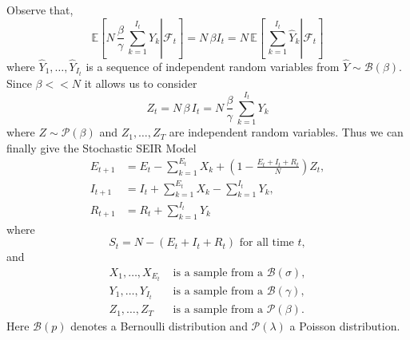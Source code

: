 \documentclass[12pt]{article}\usepackage[]{graphicx}\usepackage[]{color}
\begin{document}
Observe that,
$$
\mathbb{E}\left[\left.N \, \frac{\beta}{\gamma} \, \sum_{k=1}^{I_t} Y_k  \right| \mathcal{F}_t \right] 
= N \, \beta I_t = N \, \mathbb{E}\left[\left.\, \sum_{k=1}^{I_t} \widehat{Y}_k  \right| \mathcal{F}_t \right]
$$
where $\widehat{Y}_1,\ldots,\widehat{Y}_{I_t}$ is a sequence of independent random variables 
from $\widehat{Y} \sim \mathcal{B}( \beta).$ Since $\beta << N$ it allows us to consider
$$
Z_t = N \, \beta \, I_t = N \, \frac{\beta}{\gamma} \, \sum_{k=1}^{I_t} Y_k 
$$
where $Z \sim \mathcal{P}(\beta)$ and $Z_1,\ldots,Z_T$ are independent random variables. Thus we can finally give the Stochastic SEIR Model
\begin{align}
E_{t+1} & = E_t - \sum_{k=1}^{E_t} X_{k} + \left( 1- \frac{E_t+I_t+R_t}{N} \right)Z_t, \\
I_{t+1} & = I_t + \sum_{k=1}^{E_t} X_{k}  - \sum_{k=1}^{I_t} Y_{k}, \\
R_{t+1} & = R_t + \sum_{k=1}^{I_t} Y_{k}
\end{align}
where 
$$
S_{t} = N-(E_t+I_t+R_t) \text{ for all time }t,
$$
and
\begin{align*}
X_1,\ldots,X_{E_t} & \text{ is a sample from a } \mathcal{B}(\sigma), \\
Y_1,\ldots,Y_{I_t} & \text{ is a sample from a } \mathcal{B}(\gamma), \\
Z_1,\ldots,Z_T & \text{ is a sample from a } \mathcal{P}(\beta).
\end{align*}
Here $\mathcal{B}(p)$ denotes a Bernoulli distribution and $\mathcal{P}(\lambda)$ a Poisson distribution.
\end{document}
